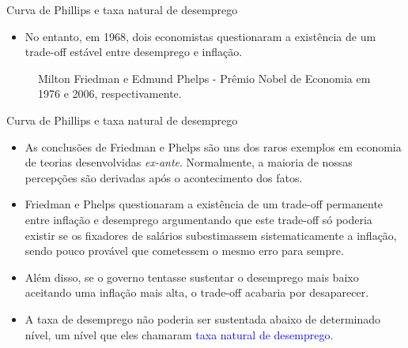 \documentclass[10pt]{beamer}
\begin{document}
\begin{frame}{Curva de Phillips e taxa natural de desemprego}
    \begin{itemize}
        \item No entanto, em 1968, dois economistas questionaram a existência de um trade-off estável entre desemprego e inflação.
    \end{itemize}
    \begin{figure}
        \centering
        \qquad
        \caption{Milton Friedman e Edmund Phelps - Prêmio Nobel de Economia em 1976 e 2006, respectivamente.}
        \label{fig1b}
    \end{figure}
\end{frame}

\begin{frame}{Curva de Phillips e taxa natural de desemprego}
    \begin{itemize}
        \item As conclusões de Friedman e Phelps são uns dos raros exemplos em economia de teorias desenvolvidas \emph{ex-ante}. Normalmente, a maioria de nossas percepções são derivadas após o acontecimento dos fatos.
        \bigskip
        \item Friedman e Phelps questionaram a existência de um trade-off permanente entre inflação e desemprego argumentando que este trade-off só poderia existir se os fixadores de salários subestimassem sistematicamente a inflação, sendo pouco provável que cometessem o mesmo erro para sempre.
        \bigskip
        \item Além disso, se o governo tentasse sustentar o desemprego mais baixo aceitando uma inflação mais alta, o trade-off acabaria por desaparecer.
        \bigskip
        \item A taxa de desemprego não poderia ser sustentada abaixo de determinado nível, um nível que eles chamaram \textcolor{blue}{taxa natural de desemprego}.
    \end{itemize}
\end{frame}
\end{document}
